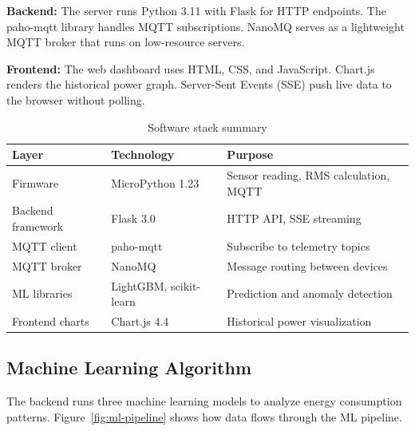 \documentclass[12pt, a4paper]{article}
\begin{document}
	\textbf{Backend:} The server runs Python 3.11 with Flask for HTTP endpoints. The paho-mqtt library handles MQTT subscriptions. NanoMQ serves as a lightweight MQTT broker that runs on low-resource servers.
	
	\textbf{Frontend:} The web dashboard uses HTML, CSS, and JavaScript. Chart.js renders the historical power graph. Server-Sent Events (SSE) push live data to the browser without polling.
	
	\begin{table}[H]
		\centering
		\caption{Software stack summary}
		\label{tab:software}
		\vspace{6pt}
		\begin{tabular}{|l|l|l|}
			\hline
			\textbf{Layer} & \textbf{Technology} & \textbf{Purpose} \\
			\hline
			Firmware & MicroPython 1.23 & Sensor reading, RMS calculation, MQTT \\
			Backend framework & Flask 3.0 & HTTP API, SSE streaming \\
			MQTT client & paho-mqtt & Subscribe to telemetry topics \\
			MQTT broker & NanoMQ & Message routing between devices \\
			ML libraries & LightGBM, scikit-learn & Prediction and anomaly detection \\
			Frontend charts & Chart.js 4.4 & Historical power visualization \\
			\hline
		\end{tabular}
	\end{table}
	
	\subsection{Machine Learning Algorithm}
	
	The backend runs three machine learning models to analyze energy consumption patterns. Figure~\ref{fig:ml-pipeline} shows how data flows through the ML pipeline.
	
\end{document}
